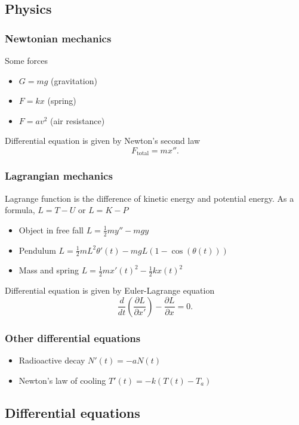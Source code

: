 \documentclass[12pt]{article}
\begin{document}
\newpage

\subsection*{Physics}

\subsubsection*{Newtonian mechanics}

Some forces
\begin{itemize}
\item $G=mg$ (gravitation)
\item $F=kx$ (spring)
\item $F=av^2$ (air resistance)
\end{itemize}
Differential equation is given by Newton's second law
$$
F_{\textrm{total}}=mx''.
$$

\subsubsection*{Lagrangian mechanics}
Lagrange function is the difference of kinetic energy and potential energy. As a formula, $L=T-U$ or $L=K-P$
\begin{itemize}
\item Object in free fall $L=\frac12 my''-mgy$
\item Pendulum $L=\frac12 mL^2\theta'(t)-mgL(1-\cos(\theta(t)))$
\item Mass and spring $L=\frac12 mx'(t)^2-\frac12 kx(t)^2$
\end{itemize}
Differential equation is given by Euler-Lagrange equation
$$
\frac{d}{dt}\left(\frac{\partial L}{\partial x'}\right)-\frac{\partial L}{\partial x}=0.
$$

\subsubsection*{Other differential equations}

\begin{itemize}
\item Radioactive decay $N'(t)=-aN(t)$
\item Newton's law of cooling $T'(t)=-k(T(t)-T_a)$
\end{itemize}

\newpage
\subsection*{Differential equations}
\end{document}

